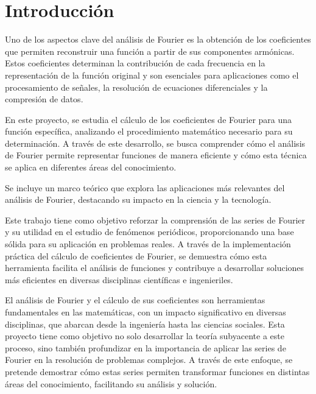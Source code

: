 \chapter[Introducción]{Introducción}
\label{cp:introduction}

{
\parindent0pt

Uno de los aspectos clave del análisis de Fourier es la obtención de los coeficientes que permiten reconstruir una función a partir de sus componentes armónicas. Estos coeficientes determinan la contribución de cada frecuencia en la representación de la función original y son esenciales para aplicaciones como el procesamiento de señales, la resolución de ecuaciones diferenciales y la compresión de datos.
\vspace{10pt}

En este proyecto, se estudia el cálculo de los coeficientes de Fourier para una función específica, analizando el procedimiento matemático necesario para su determinación. A través de este desarrollo, se busca comprender cómo el análisis de Fourier permite representar funciones de manera eficiente y cómo esta técnica se aplica en diferentes áreas del conocimiento.
\vspace{10pt}

Se incluye un marco teórico que explora las aplicaciones más relevantes del análisis de Fourier, destacando su impacto en la ciencia y la tecnología.
\vspace{10pt}

Este trabajo tiene como objetivo reforzar la comprensión de las series de Fourier y su utilidad en el estudio de fenómenos periódicos, proporcionando una base sólida para su aplicación en problemas reales. A través de la implementación práctica del cálculo de coeficientes de Fourier, se demuestra cómo esta herramienta facilita el análisis de funciones y contribuye a desarrollar soluciones más eficientes en diversas disciplinas científicas e ingenieriles.
\vspace{10pt}

El análisis de Fourier y el cálculo de sus coeficientes son herramientas fundamentales en las matemáticas, con un impacto significativo en diversas disciplinas, que abarcan desde la ingeniería hasta las ciencias sociales. Esta proyecto tiene como objetivo no solo desarrollar la teoría subyacente a este proceso, sino también profundizar en la importancia de aplicar las series de Fourier en la resolución de problemas complejos. A través de este enfoque, se pretende demostrar cómo estas series permiten transformar funciones en distintas áreas del conocimiento, facilitando su análisis y solución.




}